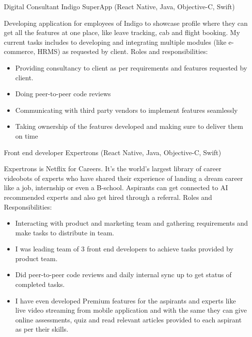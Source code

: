 

\begin{cventries}

\cventry
    {Digital Consultant}
    {Indigo SuperApp \tiny(React Native, Java, Objective-C, Swift)} %
    {} %
    {} %
    {
        Developing application for employees of Indigo to showcase profile where they can get all the features at one place, like leave tracking, cab and flight booking. My current tasks includes to developing and integrating multiple modules (like e-commerce, HRMS) as requested by client.
        \newline Roles and responsibilities:
        \begin{itemize}
            \item Providing consultancy to client as per requirements and features requested by client.
            \item Doing peer-to-peer code reviews
            \item Communicating with third party vendors to implement features seamlessly
            \item Taking ownership of the features developed and making sure to deliver them on time
        \end{itemize}
    }
\vspace{-0.7em}

  \cventry
    {Front end developer}
    {Expertrons \tiny(React Native, Java, Objective-C, Swift)} %
    {} %
    {} %
    {
        Expertrons is Netflix for Careers. It's the world's largest library of career videobots of experts who have shared their experience of landing a dream career like a job, internship or even a B-school. Aspirants can get connected to AI recommended experts and also get hired through a referral. 
        \newline Roles and Responsibilities: \begin{itemize}
            \item Interacting with product and marketing team and gathering requirements and make tasks to distribute in team.
            \item I was leading team of 3 front end developers to achieve tasks provided by product team.
            \item Did peer-to-peer code reviews and daily internal sync up to get status of completed tasks.
            \item I have even developed Premium features for the aspirants and experts like live video streaming from mobile application and with the same they can give online assessments, quiz and read relevant articles provided to each aspirant as per their skills.
        \end{itemize} 
    }
\vspace{-0.7em}


\end{cventries}
